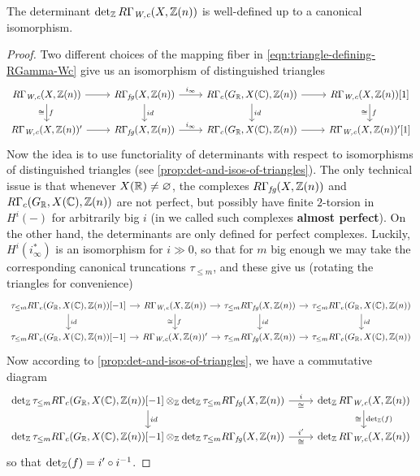 \documentclass{article}
\numberwithin{equation}{section}
\begin{document}
\begin{lemma}
  \label{lemma:determinant-of-RGamma-Wc-well-defined}
  The determinant $\operatorname{det}_{\mathbb{Z}} R\Gamma_{\text{\it W,c}} (X, \mathbb{Z}(n))$ is well-defined up to a
  canonical isomorphism.

  \begin{proof}
    Two different choices of the mapping fiber in
    \eqref{eqn:triangle-defining-RGamma-Wc} give us an isomorphism of
    distinguished triangles
    \[ \begin{tikzcd}
        R\Gamma_\Wc (X, \ZZ(n)) \ar{r}\ar{d}{f}[swap]{\cong} & R\Gamma_\fg (X,\ZZ(n)) \ar{r}{i_\infty}\ar{d}{id} & R\Gamma_c (G_\RR, X (\CC), \ZZ (n)) \ar{r}\ar{d}{id} & R\Gamma_\Wc (X, \ZZ (n)) [1]\ar{d}{f}[swap]{\cong} \\
        R\Gamma_\Wc (X, \ZZ(n))' \ar{r} & R\Gamma_\fg (X,\ZZ(n)) \ar{r}{i_\infty} & R\Gamma_c (G_\RR, X (\CC), \ZZ (n)) \ar{r} & R\Gamma_\Wc (X, \ZZ (n))' [1]
      \end{tikzcd} \]
    Now the idea is to use functoriality of determinants with respect to
    isomorphisms of distinguished triangles
    (see \ref{prop:det-and-isos-of-triangles}). The only technical issue is that
    whenever $X (\mathbb{R}) \ne \varnothing$, the complexes $R\Gamma_{\text{\it fg}} (X,\mathbb{Z}(n))$ and
    $R\Gamma_c (G_{\mathbb{R}}, X (\mathbb{C}), \mathbb{Z} (n))$ are not perfect, but possibly have
    finite $2$-torsion in $H^i (-)$ for arbitrarily big $i$ (in
    \cite{Beshenov-Weil-etale-1} we called such complexes
    \textbf{almost perfect}). On the other hand, the determinants are only
    defined for perfect complexes. Luckily, $H^i (i_\infty^*)$ is an isomorphism
    for $i \gg 0$, so that for $m$ big enough we may take the corresponding
    canonical truncations $\tau_{\le m}$, and these give us (rotating the
    triangles for convenience)
    \[ \begin{tikzcd}[column sep=1em]
        \tau_{\le m} R\Gamma_c (G_\RR, X (\CC), \ZZ (n))[-1] \ar{r}\ar{d}{id} & R\Gamma_\Wc (X, \ZZ (n))\ar{d}{f}[swap]{\cong}\ar{r} & \tau_{\le m} R\Gamma_\fg (X,\ZZ(n)) \ar{d}{id}\ar{r} & \tau_{\le m} R\Gamma_c (G_\RR, X (\CC), \ZZ (n)) \ar{d}{id} \\
        \tau_{\le m} R\Gamma_c (G_\RR, X (\CC), \ZZ (n))[-1] \ar{r} & R\Gamma_\Wc (X, \ZZ (n))' \ar{r} & \tau_{\le m} R\Gamma_\fg (X,\ZZ(n)) \ar{r} & \tau_{\le m} R\Gamma_c (G_\RR, X (\CC), \ZZ (n))
      \end{tikzcd} \]
    Now according to \ref{prop:det-and-isos-of-triangles}, we have a commutative
    diagram
    \[ \begin{tikzcd}
        \det_\ZZ \tau_{\le m} R\Gamma_c (G_\RR, X (\CC), \ZZ (n))[-1] \otimes_\ZZ \det_\ZZ \tau_{\le m} R\Gamma_\fg (X,\ZZ(n)) \ar{r}{i}[swap]{\cong} \ar{d}{id} & \det_\ZZ R\Gamma_\Wc (X,\ZZ(n)) \ar{d}{\det_\ZZ (f)}[swap]{\cong} \\
        \det_\ZZ \tau_{\le m} R\Gamma_c (G_\RR, X (\CC), \ZZ (n))[-1] \otimes_\ZZ \det_\ZZ \tau_{\le m} R\Gamma_\fg (X, \ZZ (n)) \ar{r}{i'}[swap]{\cong} & \det_\ZZ R\Gamma_\Wc (X,\ZZ(n))
      \end{tikzcd} \]
    so that $\operatorname{det}_{\mathbb{Z}} (f) = i'\circ i^{-1}$.
  \end{proof}
\end{lemma}
\end{document}
